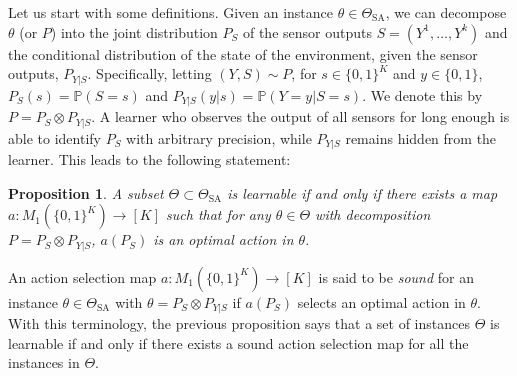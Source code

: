 \documentclass[11pt]{article} %
\newcommand{\SA}{\mathrm{SA}}
\newcommand{\TSA}{\Theta_{\SA}}
\newcommand{\Prob}[1]{\mathbb{P}\left(#1\right)}
\newtheorem{prop}{Proposition}
\begin{document}
Let us start with some definitions.
Given an instance $\theta \in \TSA$, we can decompose $\theta$ (or $P$) into the joint distribution $P_S$ of the sensor outputs $S = (Y^1,\dots,Y^k)$ and the conditional distribution of the state of the environment, given the sensor outputs, $P_{Y|S}$.
Specifically, letting $(Y,S)\sim P$, for $s\in \{0,1\}^K$ and $y\in \{0,1\}$, $P_S(s) = \Prob{S = s}$ and $P_{Y|S}(y|s) = \Prob{Y=y|S=s}$. We denote this by $P = P_S \otimes P_{Y|S}$.
A learner who observes the output of all sensors for long enough is able to identify 
$P_S$ with arbitrary precision, while $P_{Y|S}$ remains hidden from the learner.
 This leads to the following statement:
\begin{prop}
\label{prop:learnablemap}
A subset $\Theta\subset \TSA$ is learnable 
if and only if there exists a map $a: M_1( \{0,1\}^K )\to [K]$ such that 
for any $\theta \in \Theta$ 
with decomposition $P = P_S \otimes P_{Y|S}$, $a(P_S)$ is an optimal action in $\theta$.
\end{prop}


An action selection map  $a: M_1( \{0,1\}^K ) \to [K]$ is said to be \emph{sound} for an instance 
$\theta\in \TSA$ with $\theta = P_S\otimes P_{Y|S}$ if $a(P_S)$ selects an optimal action in $\theta$.
With this terminology, the previous proposition says that a set of instances $\Theta$ is learnable if and only if there exists a
sound action selection map for all the instances in $\Theta$.
\end{document}
